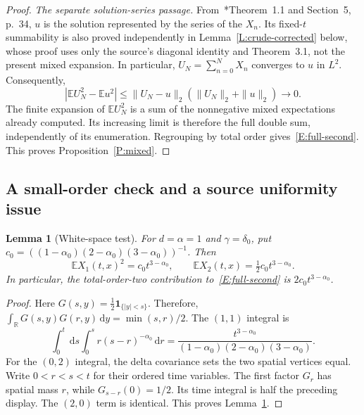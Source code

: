 \documentclass[12pt]{article}
\numberwithin{equation}{section}
\newtheorem{lemma}[theorem]{Lemma}
\theoremstyle{definition}
\newcommand{\R}{\mathbb{R}}
\newcommand{\E}{\mathbb{E}}
\newcommand{\ud}{\,\mathrm{d}}
\begin{document}
\begin{proof}
  \emph{The separate solution-series passage.}
  From~\cite{chen:author2026:time-dependency}*{Theorem~1.1 and Section~5,
  p.~34}, $u$ is the solution represented by the series of the $X_n$.
  Its fixed-$t$ summability is also proved independently in
  Lemma~\ref{L:crude-corrected} below, whose proof uses only the source's
  diagonal identity and Theorem~3.1, not the present mixed expansion.
  In particular, $U_N=\sum_{n=0}^N X_n$ converges to $u$ in $L^2$.
  Consequently,
  \[
    |\E U_N^2-\E u^2|
    \le\|U_N-u\|_2(\|U_N\|_2+\|u\|_2)\longrightarrow0.
  \]
  The finite expansion of $\E U_N^2$ is a sum of the nonnegative mixed
  expectations already computed. Its increasing limit is therefore the
  full double sum, independently of its enumeration. Regrouping by total
  order gives~\eqref{E:full-second}. This proves Proposition~\ref{P:mixed}.
\end{proof}

\subsection{A small-order check and a source uniformity issue}

\begin{lemma}[White-space test]\label{L:white-test}
  For $d=\alpha=1$ and $\gamma=\delta_0$, put
  $c_0=((1-\alpha_0)(2-\alpha_0)(3-\alpha_0))^{-1}$. Then
  \begin{equation}\label{E:white-test}
    \E X_1(t,x)^2=c_0t^{3-\alpha_0},\qquad
    \E X_2(t,x)=\tfrac12c_0t^{3-\alpha_0}.
  \end{equation}
  In particular, the total-order-two contribution to~\eqref{E:full-second}
  is $2c_0t^{3-\alpha_0}$.
\end{lemma}

\begin{proof}
  Here $G(s,y)=\frac12\mathbf1_{\{|y|<s\}}$. Therefore,
  $\int_\R G(s,y)G(r,y)\ud y=\min(s,r)/2$. The $(1,1)$ integral is
  \[
    \int_0^t\ud s\int_0^s r(s-r)^{-\alpha_0}\ud r
    =\frac{t^{3-\alpha_0}}
    {(1-\alpha_0)(2-\alpha_0)(3-\alpha_0)}.
  \]
  For the $(0,2)$ integral, the delta covariance sets the two spatial
  vertices equal. Write $0<r<s<t$ for their ordered time variables.
  The first factor $G_r$ has spatial mass $r$, while
  $G_{s-r}(0)=1/2$. Its time integral is half the
  preceding display. The $(2,0)$ term is identical. This proves
  Lemma~\ref{L:white-test}.
\end{proof}
\end{document}
